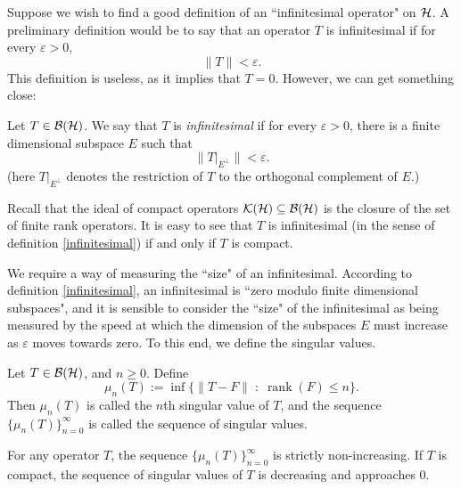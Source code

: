 Suppose we wish to find a good definition
of an ``infinitesimal operator" on $\mathcal{H}$. A preliminary definition
would be to say that an operator $T$ is infinitesimal if for every $\varepsilon > 0$, 
\begin{equation}
    \|T\| < \varepsilon.
\end{equation}  
This definition is useless, as it implies that $T = 0$. However, we can get something close:
\begin{definition}
\label{infinitesimal}
    Let $T \in \mathcal{B}(\mathcal{H})$. We say that $T$ is \emph{infinitesimal}
    if for every $\varepsilon > 0$, there is a finite dimensional
    subspace $E$ such that
    \begin{equation}
        \|T|_{E^\perp}\| < \varepsilon.
    \end{equation}
    (here $T|_{E^\perp}$ denotes the restriction of $T$ to the orthogonal complement of $E$.)
\end{definition}

\begin{remark}
    Recall that the ideal of compact operators $\mathcal{K}(\mathcal{H}) \subseteq \mathcal{B}(\mathcal{H})$
    is the closure of the set of finite rank operators. It is easy to see that $T$
    is infinitesimal (in the sense of definition \ref{infinitesimal}) if and only
    if $T$ is compact.
\end{remark}

We require a way of measuring the ``size" of an infinitesimal. According to
definition \ref{infinitesimal}, an infinitesimal is ``zero modulo finite dimensional
subspaces", and it is sensible to consider the ``size" of the infinitesimal
as being measured by the speed at which the dimension of the subspaces $E$
must increase as $\varepsilon$ moves towards zero. To this end, we define
the singular values.
\begin{definition}
    Let $T \in \mathcal{B}(\mathcal{H})$, and $n \geq 0$. Define
    \begin{equation}
        \mu_n(T) := \inf\{\|T-F\|\;:\;\operatorname{rank}(F) \leq n\}.
    \end{equation}
    Then $\mu_n(T)$ is called the $n$th singular value of $T$, and the sequence
    $\{\mu_n(T)\}_{n=0}^\infty$ is called the sequence of singular values. 
\end{definition}

\begin{remark}
    For any operator $T$, the sequence $\{\mu_n(T)\}_{n=0}^\infty$
    is strictly non-increasing.
    If $T$ is compact, the sequence of singular values of $T$
    is decreasing and approaches $0$. 
    

\end{remark}

